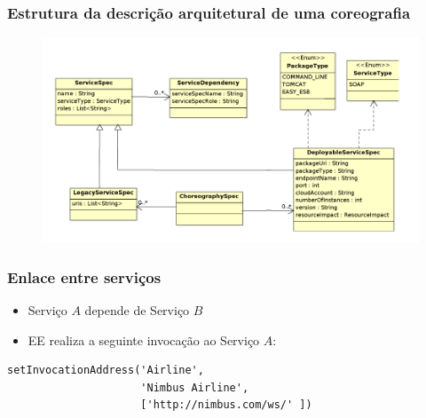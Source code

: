 \documentclass{beamer}
\begin{document}
\begin{frame}
\frametitle{Estrutura da descrição arquitetural de uma coreografia}

\begin{figure}
\includegraphics[width=1\linewidth]{img/chor_spec}
\end{figure}

\end{frame}


\begin{frame}[fragile]
\frametitle{Enlace entre serviços}

\begin{itemize}
\item Serviço $A$ depende de Serviço $B$
\item EE realiza a seguinte invocação ao Serviço $A$:
\end{itemize}

\begin{block}{}
\begin{lstlisting}
setInvocationAddress('Airline', 
                     'Nimbus Airline', 
                     ['http://nimbus.com/ws/' ])
\end{lstlisting}
\end{block}

\end{frame}

\end{document}
